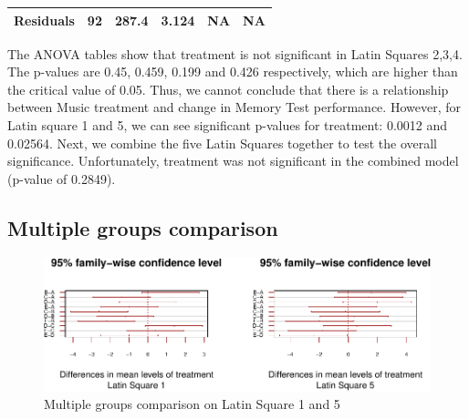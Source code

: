 \documentclass[]{article}
\begin{document}
\begin{longtable}[]{@{}cccccc@{}}
\begin{minipage}[t]{0.19\columnwidth}
\textbf{Residuals}\strut
\end{minipage} & \begin{minipage}[t]{0.06\columnwidth}\centering\strut
92\strut
\end{minipage} & \begin{minipage}[t]{0.10\columnwidth}\centering\strut
287.4\strut
\end{minipage} & \begin{minipage}[t]{0.12\columnwidth}\centering\strut
3.124\strut
\end{minipage} & \begin{minipage}[t]{0.12\columnwidth}\centering\strut
NA\strut
\end{minipage} & \begin{minipage}[t]{0.12\columnwidth}\centering\strut
NA\strut
\end{minipage}\tabularnewline
\bottomrule
\end{longtable}

The ANOVA tables show that treatment is not significant in Latin Squares
2,3,4. The p-values are 0.45, 0.459, 0.199 and 0.426 respectively, which
are higher than the critical value of 0.05. Thus, we cannot conclude
that there is a relationship between Music treatment and change in
Memory Test performance. However, for Latin square 1 and 5, we can see
significant p-values for treatment: 0.0012 and 0.02564. Next, we combine
the five Latin Squares together to test the overall significance.
Unfortunately, treatment was not significant in the combined model
(p-value of 0.2849).

\subsection{Multiple groups
comparison}\label{multiple-groups-comparison}

\begin{figure}
\centering
\includegraphics{music_memory_files/figure-latex/unnamed-chunk-7-1.pdf}
\caption{Multiple groups comparison on Latin Square 1 and 5}
\end{figure}
\end{document}
